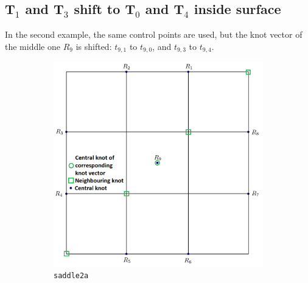 \documentclass{article}
\begin{document}
\subsection{$\textbf{T}_1$ and $\textbf{T}_3$ shift to $\textbf{T}_0$ and $\textbf{T}_4$ inside surface}

\vspace{6pt}

In the second example, the same control points are used, but the knot vector of the middle one $R_9$ is shifted: $t_{9, 1}$ to $t_{9, 0}$, and $t_{9, 3}$ to $t_{9, 4}$.

\begin{figure}[H]
\centering
\begin{subfigure}[b]{0.48\textwidth}
\includegraphics[width=\textwidth]{saddle2aparam}
\caption{\texttt{saddle2a}}
\label{saddle2ap}
\end{subfigure}
\begin{subfigure}[b]{0.48\textwidth}

\end{subfigure}
\end{figure}
\end{document}
